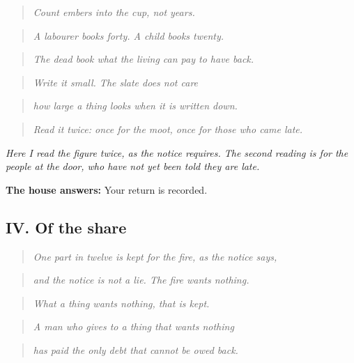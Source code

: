 \documentclass{design/chronicle}
\begin{document}
\begin{quote}\itshape Count embers into the cup, not years.\end{quote}

\begin{quote}\itshape A labourer books forty. A child books twenty.\end{quote}

\begin{quote}\itshape The dead book what the living can pay to have back.\end{quote}

\begin{quote}\itshape Write it small. The slate does not care\end{quote}

\begin{quote}\itshape how large a thing looks when it is written down.\end{quote}

\begin{quote}\itshape Read it twice: once for the moot, once for those who came late.\end{quote}

\emph{Here I read the figure twice, as the notice requires. The second reading is for the people at the door, who have not yet been told they are late.}

\textbf{The house answers:} Your return is recorded.

\subsection*{IV. Of the share}

\begin{quote}\itshape One part in twelve is kept for the fire, as the notice says,\end{quote}

\begin{quote}\itshape and the notice is not a lie. The fire wants nothing.\end{quote}

\begin{quote}\itshape What a thing wants nothing, that is kept.\end{quote}

\begin{quote}\itshape A man who gives to a thing that wants nothing\end{quote}

\begin{quote}\itshape has paid the only debt that cannot be owed back.\end{quote}
\end{document}
